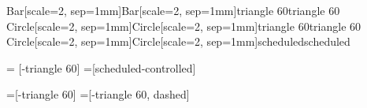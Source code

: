\usetikzlibrary{arrows.meta}
%
{Bar[scale=2, sep=1mm]}{Bar[scale=2, sep=1mm]}{triangle 60}{triangle 60}
%
{Circle[scale=2, sep=1mm]}{Circle[scale=2, sep=1mm]}{triangle 60}{triangle 60}
%
{Circle[scale=2, sep=1mm]}{Circle[scale=2, sep=1mm]}{scheduled}{scheduled}

 = [-triangle 60]
=[scheduled-controlled]

=[-triangle 60]
=[-triangle 60, dashed]